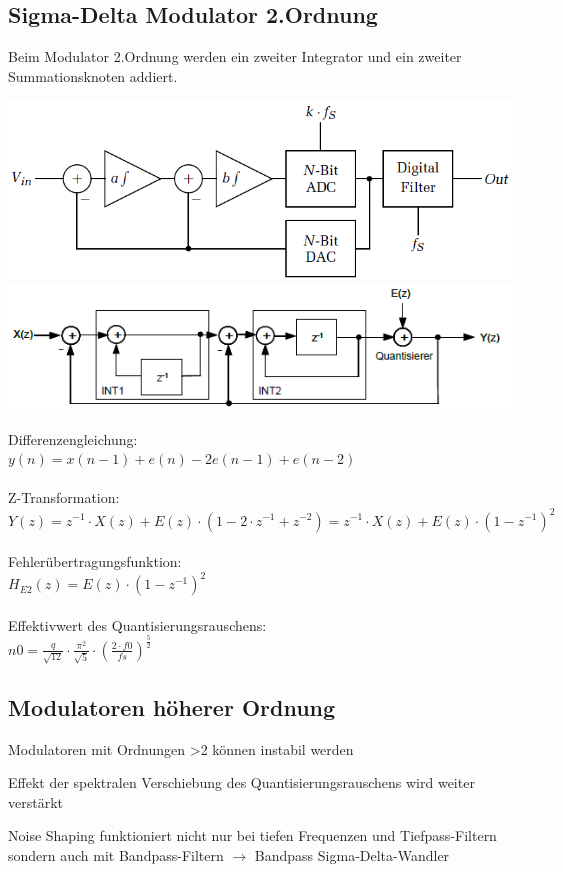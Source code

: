 \subsection{Sigma-Delta Modulator 2.Ordnung}
Beim Modulator 2.Ordnung werden ein zweiter Integrator und ein zweiter Summationsknoten addiert.
\begin{minipage}{0.45\textwidth}
    \includegraphics[width=1.0\textwidth]{images/SigmaDelta2Ordnung}
    \includegraphics[width=1.0\textwidth]{images/SigmaDeltaZeitdiskretesModell2}
\end{minipage}
\hfill
\begin{minipage}{0.45\textwidth}
    Differenzengleichung:\\
    $y(n) = x(n-1) + e(n) -2e(n-1) + e(n-2)$\\\\
    Z-Transformation:\\ $Y(z)= z^{-1} \cdot X(z) + E(z) \cdot (1-2\cdot z^{-1} + z^{-2}) = z^{-1} \cdot X(z) + E(z) \cdot (1-z^{-1})^2$\\\\
    Fehlerübertragungsfunktion:\\
    $H_{E2}(z) = E(z) \cdot (1-z^{-1})^2$\\\\
    Effektivwert des Quantisierungsrauschens:\\
    $n0=\frac{q}{\sqrt{12}}\cdot \frac{\pi ^2}{\sqrt{5}}\cdot (\frac{2 \cdot f0}{fs})^\frac{5}{2}$
    
\end{minipage}
\subsection{Modulatoren höherer Ordnung}
\begin{compactitem}
    \item Modulatoren mit Ordnungen \textgreater 2 können instabil werden
    \item Effekt der spektralen Verschiebung des Quantisierungsrauschens wird weiter verstärkt
    \item Noise Shaping funktioniert nicht nur bei tiefen Frequenzen und Tiefpass-Filtern sondern auch mit Bandpass-Filtern $\rightarrow$ Bandpass Sigma-Delta-Wandler
\end{compactitem}

